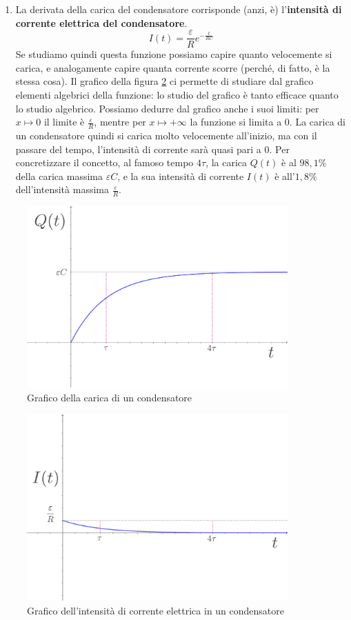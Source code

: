 \documentclass[a3paper, twoside, openany]{book}
\theoremstyle{definition}
\begin{document}
\begin{enumerate}
\item La derivata della carica del condensatore corrisponde (anzi, è) l'\textbf{intensità di corrente elettrica del condensatore}. $$I(t)=\frac{\varepsilon}{R} e^{-\frac{t}{RC}}$$ Se studiamo quindi questa funzione possiamo capire quanto velocemente si carica, e analogamente capire quanta corrente scorre (perché, di fatto, è la stessa cosa). Il grafico della figura \ref{fig:corrente} ci permette di studiare dal grafico elementi algebrici della funzione: lo studio del grafico è tanto efficace quanto lo studio algebrico. Possiamo dedurre dal grafico anche i suoi limiti: per $x\mapsto 0$ il limite è $\frac{\varepsilon}{R}$, mentre per $x\mapsto +\infty$ la funzione si limita a 0. La carica di un condensatore quindi si carica molto velocemente all'inizio, ma con il passare del tempo, l'intensità di corrente sarà quasi pari a 0. Per concretizzare il concetto, al famoso tempo $4\tau$, la carica $Q(t)$ è al $98,1\%$ della carica massima $\varepsilon C$, e la sua intensità di corrente $I(t)$ è all'$1,8\%$ dell'intensità massima $\frac{\varepsilon}{R}$.
\end{enumerate}
\begin{figure}[htp]
    \centering
    \includegraphics[width=10cm]{Carica}
    \caption{Grafico della carica di un condensatore}
    \label{fig:carica}
\end{figure}
\begin{figure}[htp]
    \centering
    \includegraphics[width=10cm]{Corrente}
    \caption{Grafico dell'intensità di corrente elettrica in un condensatore}
    \label{fig:corrente}
\end{figure}
\end{document}
